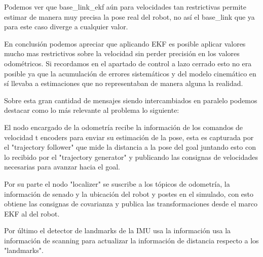 

Podemos ver que base\_link\_ekf aún para velocidades tan restrictivas permite estimar de manera muy precisa la pose real del robot, no así el base\_link que ya para este caso diverge a cualquier valor.

En conclusión podemos apreciar que aplicando EKF es posible aplicar valores mucho mas restrictivos sobre la velocidad sin perder precisión en los valores odométricos. Si recordamos en el apartado de control a lazo cerrado esto no era posible ya que la acumulación de errores sistemáticos y del modelo cinemático en sí llevaba a estimaciones que no representaban de manera alguna la realidad.




Sobre esta gran cantidad de mensajes siendo intercambiados en paralelo podemos destacar como lo más relevante al problema lo siguiente:

El nodo encargado de la odometría recibe la información de los comandos de velocidad t encoders para enviar su estimación de la pose, esta es capturada por el "trajectory follower" que mide la distancia a la pose del goal juntando esto con lo recibido por el "trajectory generator" y publicando las consignas de velocidades necesarias para avanzar hacia el goal.

Por su parte el nodo "localizer" se suscribe a los tópicos de odometría, la información de senado y la ubicación del robot y postes en el simulado, con esto obtiene las consignas de covarianza y publica las transformaciones desde el marco EKF al del robot.

Por último el detector de landmarks de la IMU usa la información usa la información de scanning para actualizar la información de distancia respecto a los "landmarks".

